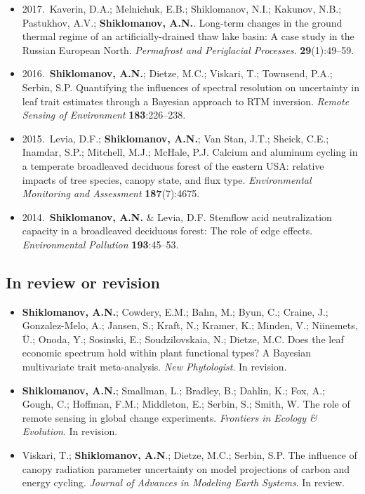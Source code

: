 \begin{itemize}
  \item 2017.~Kaverin, D.A.; Melnichuk, E.B.; Shiklomanov, N.I.; Kakunov, N.B.; Pastukhov, A.V.; \textbf{Shiklomanov, A.N.}.
    Long-term changes in the ground thermal regime of an artificially-drained thaw lake basin: A case study in the Russian European North.
    \textit{Permafrost and Periglacial Processes}. \textbf{29}(1):49--59.

  \item 2016.~\textbf{Shiklomanov, A.N.}; Dietze, M.C.; Viskari, T.; Townsend, P.A.; Serbin, S.P. 
    Quantifying the influences of spectral resolution on uncertainty in leaf trait estimates through a Bayesian approach to RTM inversion. 
    \textit{Remote Sensing of Environment} \textbf{183}:226--238. 

  \item 2015.~Levia, D.F.; \textbf{Shiklomanov, A.N.}; Van Stan, J.T.; Sheick, C.E.; Inamdar, S.P.; Mitchell, M.J.; McHale, P.J. 
    Calcium and aluminum cycling in a temperate broadleaved deciduous forest of the eastern USA\@: relative impacts of tree species, canopy state, and flux type. 
    \textit{Environmental Monitoring and Assessment} \textbf{187}(7):4675. 

  \item 2014.~\textbf{Shiklomanov, A.N.} \& Levia, D.F. 
    Stemflow acid neutralization capacity in a broadleaved deciduous forest: The role of edge effects. 
    \textit{Environmental Pollution} \textbf{193}:45--53. 
\end{itemize}

\subsection*{In review or revision}

\begin{itemize}
  \item \textbf{Shiklomanov, A.N.}; Cowdery, E.M.; Bahn, M.; Byun, C.; Craine, J.; Gonzalez-Melo, A.; Jansen, S.; Kraft, N.; Kramer, K.; Minden, V.; Niinemets, Ü.; Onoda, Y.; Sosinski, E.; Soudzilovskaia, N.; Dietze, M.C. 
    Does the leaf economic spectrum hold within plant functional types? A Bayesian multivariate trait meta-analysis.
    \textit{New Phytologist}. In revision.

  \item \textbf{Shiklomanov, A.N.}; Smallman, L.; Bradley, B.; Dahlin, K.; Fox, A.; Gough, C.; Hoffman, F.M.; Middleton, E.; Serbin, S.; Smith, W. The role of remote sensing in global change experiments. \textit{Frontiers in Ecology \& Evolution}. In revision.

  \item Viskari, T.; \textbf{Shiklomanov, A.N}.; Dietze, M.C.; Serbin, S.P. The influence of canopy radiation parameter uncertainty on model projections of carbon and energy cycling.
    \textit{Journal of Advances in Modeling Earth Systems}. In review.
\end{itemize}

